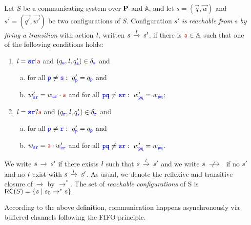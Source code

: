 \begin{definition}
Let $S$ be a communicating system over $\roles$ and $\mathbb{A}$, and let $s= (\vec{q},\vec{w})$ and $s'= (\vec{q'},\vec{w'})$ 
be two configurations of $S$. %
Configuration $s'$ {\em is reachable from} $s$
{\em by firing  a transition} with action $\elle$, written $s\lts{\elle}s'$, if there is $\msg[a]\in\mathbb{A}$
such that one of the following conditions holds:
\begin{enumerate}
\item
$\elle = \tts\ttr!\msg[a]$ and $(q_\tts,\elle,q'_\tts)\in\delta_\tts$ and
\qquad \begin{enumerate}[a)]
\item
for all $\ttp\neq\tts: ~ q'_\ttp =  q_\ttp$  and
\item
$w'_{\tts\ttr} =  w_{\tts\ttr}\cdot \msg[a]$ and for all $\ttp\ttq\neq\tts\ttr: ~ w'_{\ttp\ttq} =  w_{\ttp\ttq}$;
\end{enumerate}
\item 
$\elle = \tts\ttr?\msg[a]$ and $(q_\ttr,\elle,q'_\ttr)\in\delta_\ttr$ and
\begin{enumerate}[a)]
\item
for all $\ttp\neq\ttr: ~ q'_\ttp =  q_\ttp$  and
\item
$w_{\tts\ttr} =  \msg[a]\cdot w'_{\tts\ttr}$ and for all $\ttp\ttq\neq\tts\ttr: ~w'_{\ttp\ttq} =  w_{\ttp\ttq}$.
\end{enumerate}
\end{enumerate}
We write $s\lts{}s'$ if there exists $\elle$ such that  $s\lts{\elle}s'$
 and we write $s\notlts{}\hspace{2mm}$ if no $s'$ and no $\elle$ exist with
$s\lts{\elle}s'$.
As usual, we denote the reflexive and transitive 
closure of $\lts{}$ by $\to^*$.
The set of {\em reachable configurations} of S is $\RS(S) = \Set{s \mid s_0 \to^* s}.$
\end{definition}
\noindent
According to the above definition, communication happens asynchronously via buffered channels following the FIFO principle.\\



